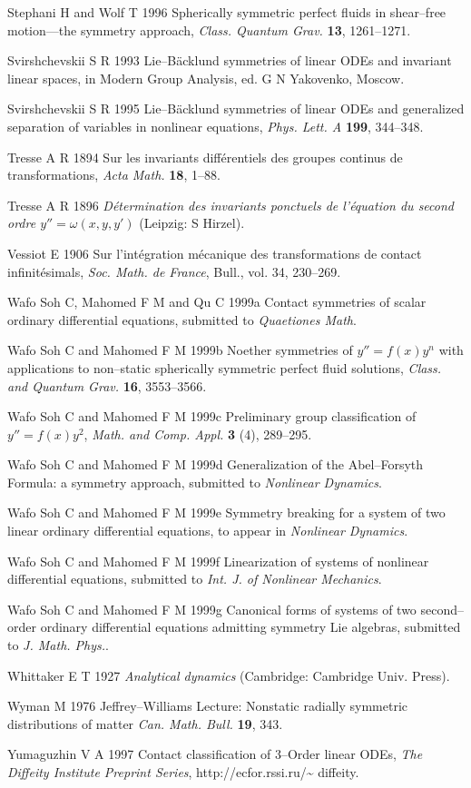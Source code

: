 Stephani H and Wolf T 1996 Spherically
symmetric perfect fluids in shear--free motion---the symmetry approach,
{\em Class. Quantum Grav.} {\bf 13}, 1261--1271. 

Svirshchevskii S R 1993 Lie--B\"acklund symmetries
of linear ODEs and invariant linear spaces, in Modern Group Analysis, ed.
G N Yakovenko, Moscow.

Svirshchevskii S R 1995 Lie--B\"acklund symmetries
of linear ODEs and generalized separation of variables in nonlinear equations,
{\em Phys. Lett. A} {\bf 199}, 344--348.

Tresse A R 1894 Sur les invariants diff\'erentiels
des groupes continus de transformations, {\em Acta Math.} {\bf 18}, 1--88.

Tresse A R 1896 {\em D\'etermination des invariants
ponctuels de l'\'equation du second ordre $y''=\omega (x,y,y')$}
(Leipzig: S Hirzel).

Vessiot E 1906  Sur l'int\'egration m\'ecanique
des transformations de contact infinit\'esimals, {\em Soc. Math. de France},
Bull., vol. 34, 230--269.

Wafo Soh C, Mahomed F M and Qu C 1999a Contact symmetries of scalar ordinary
differential equations, submitted to {\em Quaetiones Math}.

Wafo Soh C and Mahomed F M 1999b Noether symmetries of $y''=f(x)y^n$
with applications to non--static spherically symmetric perfect fluid
solutions, {\em Class. and Quantum Grav.} {\bf 16}, 3553--3566.

Wafo Soh C and Mahomed F M 1999c Preliminary group classification of
$y''=f(x)y^2$, {\em Math. and Comp. Appl.} {\bf 3} (4), 289--295.

Wafo Soh C and Mahomed F M 1999d Generalization of the Abel--Forsyth
Formula: a symmetry approach, submitted to {\em Nonlinear Dynamics}.

Wafo Soh C and Mahomed F M 1999e Symmetry breaking for a system of two
linear ordinary differential equations, to appear in
{\em Nonlinear Dynamics}.

Wafo Soh C and Mahomed F M 1999f Linearization of systems of nonlinear
differential equations, submitted to {\em Int. J. of Nonlinear Mechanics}.

Wafo Soh C and Mahomed F M 1999g Canonical forms of systems of two
second--order ordinary differential equations admitting symmetry Lie
algebras, submitted to {\em  J. Math. Phys.}.

Whittaker E T 1927 {\em Analytical dynamics} (Cambridge: Cambridge
Univ. Press).

Wyman M 1976  Jeffrey--Williams Lecture: Nonstatic radially symmetric
distributions of matter {\em Can. Math. Bull.} {\bf 19}, 343. 

Yumaguzhin V A 1997  Contact classification of
3--Order linear ODEs, {\em The Diffeity Institute Preprint Series},
http://ecfor.rssi.ru/\~{ } diffeity.

%
